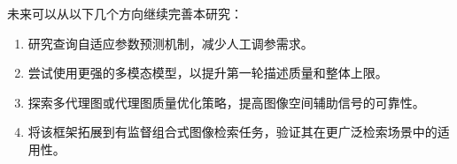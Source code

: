 \documentclass[12pt,a4paper,UTF8,oneside,openany]{ctexrep}
\begin{document}
未来可以从以下几个方向继续完善本研究：
\begin{enumerate}[leftmargin=2\ccwd]
  \item 研究查询自适应参数预测机制，减少人工调参需求。
  \item 尝试使用更强的多模态模型，以提升第一轮描述质量和整体上限。
  \item 探索多代理图或代理图质量优化策略，提高图像空间辅助信号的可靠性。
  \item 将该框架拓展到有监督组合式图像检索任务，验证其在更广泛检索场景中的适用性。
\end{enumerate}


\clearpage
{}
{}
\end{document}
